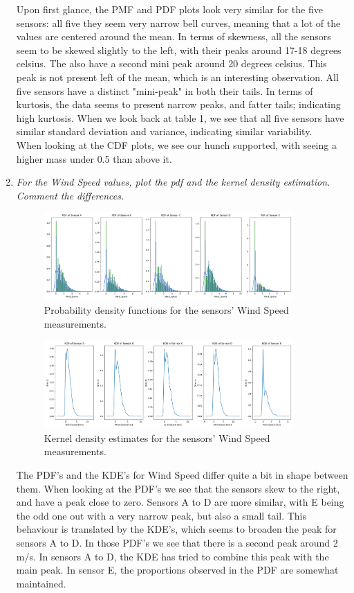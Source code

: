 \documentclass[a4paper,12pt]{article} %
\begin{document}
\begin{enumerate}
Upon first glance, the PMF and PDF plots look very similar for the five sensors: all five they seem very narrow bell curves, meaning that a lot of the values are centered around the mean. In terms of skewness, all the sensors seem to be skewed slightly to the left, with their peaks around 17-18 degrees celsius. The also have a second mini peak around 20 degrees celsius. This peak is not present left of the mean, which is an interesting observation. All five sensors have a distinct "mini-peak" in both their tails. In terms of kurtosis, the data seems to present narrow peaks, and fatter tails; indicating high kurtosis. When we look back at table 1, we see that all five sensors have similar standard deviation and variance, indicating similar variability. 
\\When looking at the CDF plots, we see our hunch supported, with seeing a higher mass under 0.5 than above it. 
\item{\it For the Wind Speed values, plot the pdf and the kernel density estimation. Comment the differences.}
\begin{figure}[H] %
    \centering %
    \includegraphics[width=0.9\textwidth]{plot_PDF_WS.png} 
    \caption{Probability density functions for the sensors' Wind Speed measurements.} %
  \end{figure}
\begin{figure}[H] %
    \centering %
    \includegraphics[width=0.9\textwidth]{plot_KDE_WS.png} 
    \caption{Kernel density estimates for the sensors' Wind Speed measurements.} %
  \end{figure}
The PDF's and the KDE's for Wind Speed differ quite a bit in shape between them. When looking at the PDF's we see that the sensors skew to the right, and have a peak close to zero. Sensors A to D are more similar, with E being the odd one out with a very narrow peak, but also a small tail. This behaviour is translated by the KDE's, which seems to broaden the peak for sensors A to D. In those PDF's we see that there is a second peak around 2 m/s. In sensors A to D, the KDE has tried to combine this peak with the main peak. In sensor E, the proportions observed in the PDF are somewhat maintained.  
\newpage


\end{enumerate}
\end{document}
